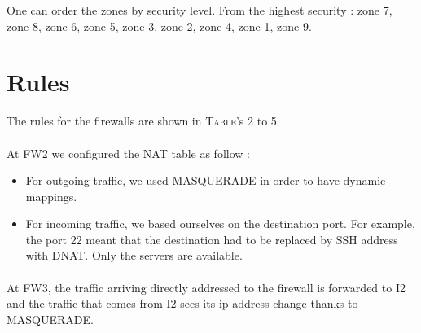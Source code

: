 \documentclass[a4paper,titlepage]{article}
\begin{document}
One can order the zones by security level. From the highest security : zone 7, zone 8, zone 6, zone 5, zone 3, zone 2, zone 4, zone 1, zone 9.

\section{Rules}
\label{sec:Rules}

The rules for the firewalls are shown in \textsc{Table}'s 2 to 5.

\paragraph{}

At FW2 we configured the NAT table as follow :
\begin{itemize}
\item For outgoing traffic, we used MASQUERADE in order to have dynamic mappings.
\item For incoming traffic, we based ourselves on the destination port. For example, the port 22 meant that the destination had to be replaced by SSH address with DNAT. Only the servers are available.
\end{itemize}

\paragraph{}

At FW3, the traffic arriving directly addressed to the firewall is forwarded to I2 and the traffic that comes from I2 sees its ip address change thanks to MASQUERADE.


\end{document}
